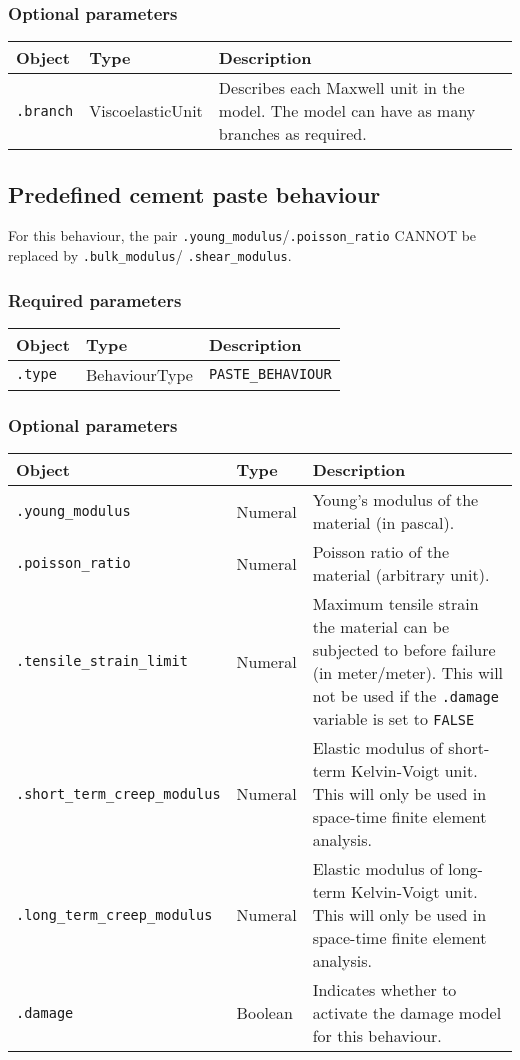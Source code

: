 \documentclass[10pt]{article}
\begin{document}
\subsubsection*{Optional parameters}

\begin{tabularx}{\textwidth}{llX}
\hline 
Object & Type & Description \\ 
\hline 
\verb+.branch+ & ViscoelasticUnit & Describes each Maxwell unit in the model. The model can have as many branches as required. \\ 
\hline 
\end{tabularx}

\subsection{Predefined cement paste behaviour}

For this behaviour, the pair \verb+.young_modulus+/\verb+.poisson_ratio+ CANNOT be replaced by \verb+.bulk_modulus+/ \verb+.shear_modulus+.

\subsubsection*{Required parameters}

\begin{tabularx}{\textwidth}{llX}
\hline 
Object & Type & Description \\ 
\hline 
\verb+.type+ & BehaviourType & \verb+PASTE_BEHAVIOUR+ \\ 
\hline 
\end{tabularx}

\subsubsection*{Optional parameters}

\begin{tabularx}{\textwidth}{llX}
\hline 
Object & Type & Description \\ 
\hline 
\verb+.young_modulus+ & Numeral & Young's modulus of the material (in pascal). \\ 
\verb+.poisson_ratio+ & Numeral & Poisson ratio of the material (arbitrary unit). \\ 
\verb+.tensile_strain_limit+ & Numeral & Maximum tensile strain the material can be subjected to before failure (in meter/meter). This will not be used if the \verb+.damage+ variable is set to \verb+FALSE+\\
\verb+.short_term_creep_modulus+ & Numeral & Elastic modulus of short-term Kelvin-Voigt unit. This will only be used in space-time finite element analysis.\\ 
\verb+.long_term_creep_modulus+ & Numeral & Elastic modulus of long-term Kelvin-Voigt unit. This will only be used in space-time finite element analysis.\\ 
\verb+.damage+ & Boolean & Indicates whether to activate the damage model for this behaviour. \\
\hline 
\end{tabularx}
\end{document}
